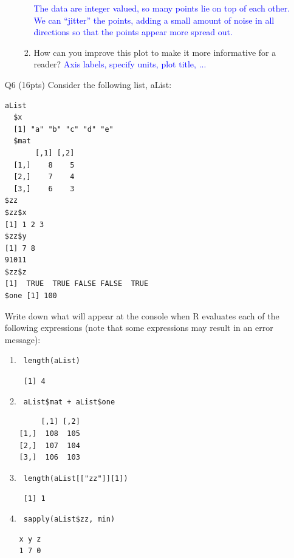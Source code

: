 \documentclass[12pt]{article}
\theoremstyle{Conjecture}
\theoremstyle{example}
\theoremstyle{remark}
\theoremstyle{lemma}
\theoremstyle{definition}
\theoremstyle{corol}
\theoremstyle{proposition}
\theoremstyle{condition}
\begin{document}
\begin{enumerate}
\begin{enumerate}
\begin{enumerate}
  \textcolor{blue}{The data are integer valued, so many points lie on top of each other. We can ``jitter'' the points, adding a small amount of noise in all directions so that the points appear more spread out.}
  \item How can you improve this plot to make it more informative for a reader?
  \textcolor{blue}{Axis labels, specify units, plot title, ...}
\end{enumerate}
\end{enumerate}

\newpage
\item[Q6] (16pts) Consider the following list, aList:
\begin{verbatim}
aList
  $x
  [1] "a" "b" "c" "d" "e"
  $mat
       [,1] [,2]
  [1,]    8    5
  [2,]    7    4
  [3,]    6    3
$zz
$zz$x
[1] 1 2 3
$zz$y
[1] 7 8
91011
$zz$z
[1]  TRUE  TRUE FALSE FALSE  TRUE
$one [1] 100
\end{verbatim}
Write down what will appear at the console when R evaluates each of 
the following expressions (note that some expressions may result in 
an error message):
\begin{enumerate}
\item \verb| length(aList) |

\verb| [1] 4 |
\item \verb| aList$mat + aList$one|

\begin{verbatim}
     [,1] [,2]
[1,]  108  105
[2,]  107  104
[3,]  106  103
\end{verbatim}
\item \verb| length(aList[["zz"]][1])|

\verb| [1] 1 |
\item \verb| sapply(aList$zz, min)|

\begin{verbatim}
x y z 
1 7 0 
\end{verbatim}
\end{enumerate}
\end{enumerate}
\end{document}
